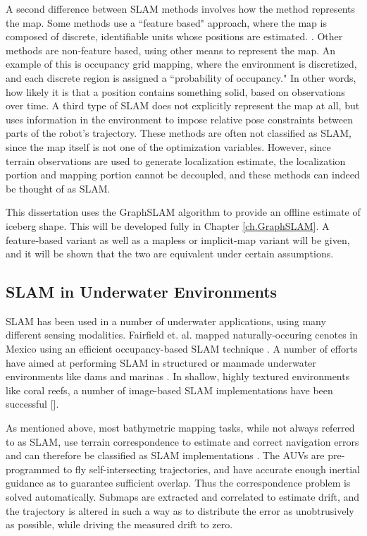 A second difference between SLAM methods involves how the method represents the map. Some methods use a ``feature based" approach, where the map is composed of discrete, identifiable units whose positions are estimated. \cite{?}. Other methods are non-feature based, using other means to represent the map. An example of this is occupancy grid mapping, where the environment is discretized, and each discrete region is assigned a ``probability of occupancy." In other words, how likely it is that a position contains something solid, based on observations over time.  A third type of SLAM does not explicitly represent the map at all, but uses information in the environment to impose relative pose constraints between parts of the robot's trajectory. These methods are often not classified as SLAM, since the map itself is not one of the optimization variables. However, since terrain observations are used to generate localization estimate,  the localization portion and mapping portion cannot be decoupled, and these methods can indeed be thought of as SLAM. 

This dissertation uses the GraphSLAM algorithm \cite{} to provide an offline estimate of iceberg shape. This will be developed fully in Chapter \ref{ch.GraphSLAM}. A feature-based variant as well as a mapless or implicit-map variant will be given, and it will be shown that the two are equivalent under certain assumptions. 

\subsection{SLAM in Underwater Environments}

SLAM has been used in a number of underwater applications, using many different sensing modalities. Fairfield et. al. mapped naturally-occuring cenotes in Mexico using an efficient occupancy-based SLAM technique \cite{Fairfield...}. A number of efforts have aimed at performing SLAM in structured or manmade underwater environments like dams and marinas \cite{Ribas}. In shallow, highly textured environments like coral reefs, a number of image-based SLAM implementations have been successful [\cite{?}].

As mentioned above, most bathymetric mapping tasks, while not always referred to as SLAM, use terrain correspondence to estimate and correct navigation errors and can therefore be classified as SLAM implementations \cite{anything by Caress}. The AUVs are pre-programmed to fly self-intersecting trajectories, and have accurate enough inertial guidance as to guarantee sufficient overlap. Thus the correspondence problem is solved automatically. Submaps are extracted and correlated to estimate drift, and the trajectory is altered in such a way as to distribute the error as unobtrusively as possible, while driving the measured drift to zero.

